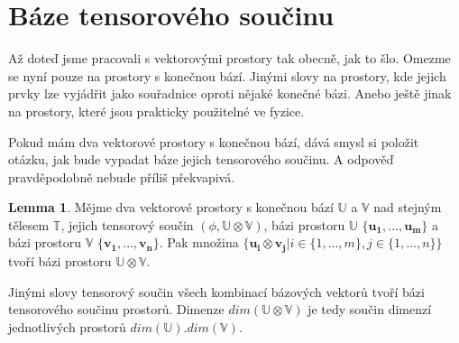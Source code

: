 \documentclass[a5paper,12pt]{amsbook}
\theoremstyle{definition}
\newtheorem{lemma}[theorem]{Lemma}
\newcommand{\myvec}[1]{\mathbf{#1}}
\newcommand{\myspace}[1]{\mathbb{#1}}
\begin{document}
\section{Báze tensorového součinu}

\noindent
Až doteď jsme pracovali s vektorovými prostory tak obecně, jak to šlo. Omezme se nyní pouze na
prostory s konečnou bází. Jinými slovy na prostory, kde jejich prvky lze vyjádřit jako souřadnice
oproti nějaké konečné bázi. Anebo ještě jinak na prostory, které jsou prakticky použitelné ve
fyzice.

Pokud mám dva vektorové prostory s konečnou bází, dává smysl si položit otázku, jak bude
vypadat báze jejich tensorového součinu. A odpověď pravděpodobně nebude příliš překvapivá.

\begin{lemma}
\label{lemma:tensor_basis}
Mějme dva vektorové prostory s konečnou bází $\myspace{U}$ a $\myspace{V}$ nad stejným tělesem
$\myspace{T}$, jejich tensorový součin $(\phi, \myspace{U}\otimes\myspace{V})$, bázi prostoru
$\myspace{U}$ $\{\myvec{u_1}, \dots, \myvec{u_m}\}$ a bázi prostoru $\myspace{V}$
$\{\myvec{v_1}, \dots, \myvec{v_n}\}$. Pak množina $\{\myvec{u_i}\otimes\myvec{v_j}| i \in
\{1, \dots, m\}, j \in \{1, \dots, n\}\}$ tvoří bázi prostoru $\myspace{U}\otimes\myspace{V}$.
\end{lemma}

Jinými slovy tensorový součin všech kombinací bázových vektorů tvoří bázi tensorového součinu
prostorů. Dimenze $dim(\myspace{U}\otimes\myspace{V})$ je tedy součin dimenzí jednotlivých
prostorů $dim(\myspace{U}).dim(\myspace{V})$.
\end{document}
